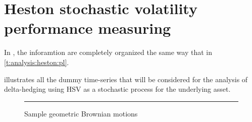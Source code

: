 \documentclass[12pt]{report}
\begin{document}
\section{Heston stochastic volatility performance measuring}
\label{sec:section name}


In , the inforamtion are completely organized the same way that in \cref{t:analysis:heston:pl}.

 illustrates all the dummy time-series that will be considered for the analysis of delta-hedging using HSV as a stochastic process for the underlying asset.


\begin{figure}[ht]
  \centering
  \rule{40mm}{20mm}
  \caption{Sample geometric Brownian motions}
  \label{p:analysis:mjd:100}
\end{figure}
\end{document}
